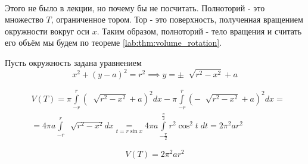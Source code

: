 \documentclass[../main.tex]{subfiles}
\begin{document}
\begin{example}
    
    ~


    Этого не было в лекции, но почему бы не посчитать. Полноторий - это множество \( T\), ограниченное тором. Тор - это поверхность, полученная вращением окружности вокруг оси \( x\).
    Таким образом, полноторий - тело вращения и считать его объём мы будем по теореме \ref{lab:thm:volume_rotation}. 
    
    Пусть окружность задана уравнением 
    \[ x^2+\left( y-a\right)^2=r^2 \implies y=\pm\; \sqrt[]{r^2-x^2}+a\]

    \vspace{6pt}
    \begin{flushleft}
        \begin{equation*}
            \begin{aligned}
                &V\left( T\right)= \pi \displaystyle\int\limits_{ -r}^{ r} \left( \; \sqrt[]{r^2-x^2}+a\right)^2dx- \pi \displaystyle\int\limits_{ -r}^{ r} \left( -\; \sqrt[]{r^2-x^2}+a\right)^2dx= \\ 
                &=4\pi a \displaystyle\int\limits_{ -r}^{ r} \; \sqrt[]{r^2-x^2}dx \underset{t=r\sin x}{=}4 \pi a \displaystyle\int\limits_{ - \frac{ \pi}{ 2}}^{ \frac{ \pi}{ 2}} r^2\cos^2 t\;dt=2 \pi^2 a r^2
            \end{aligned}
        \end{equation*}
    \end{flushleft}
    \[ \boxed{V\left( T\right)=2 \pi^2 ar^2}\]
\end{example}
\end{document}
